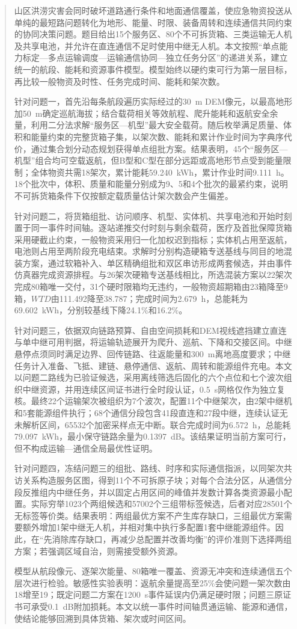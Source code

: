 \begin{abstract}
山区洪涝灾害会同时破坏道路通行条件和地面通信覆盖，使应急物资投送从单纯的最短路问题转化为地形、能量、时限、装备周转和连续通信共同约束的协同决策问题。题目给出15个服务区、80个不可拆货箱、三类运输无人机及共享电池，并允许在直连通信不足时使用中继无人机。本文按照“单点能力标定—多点运输调度—运输通信协同—独立任务分区”的递进关系，建立统一的航段、能耗和资源事件模型。模型始终以硬约束可行为第一层目标，再比较一般物资及时性、任务完成时间、能耗和架次数。

针对问题一，首先沿每条航段遍历实际经过的30~m DEM像元，以最高地形加50~m确定巡航海拔；结合载荷相关等效航程、爬升能耗和返航安全余量，利用二分法求解“服务区—机型”最大安全载荷。随后枚举满足质量、体积和能量约束的完整货箱子集，以架次数、能耗和累计作业时间为字典序代价，通过集合划分动态规划获得单点组批方案。结果表明，45个“服务区—机型”组合均可空载返航，但B型和C型在部分远距或高地形节点受到能量限制；全体物资共需18架次，累计能耗59.240~kWh，累计作业时间9.111~h。18个批次中，体积、质量和能量分别成为9、5和4个批次的最紧约束，说明不可拆货箱条件下仅按额定载质量估计架次数会产生偏差。

针对问题二，将货箱组批、访问顺序、机型、实体机、共享电池和开始时刻置于同一事件时间轴。逐站递推交付时刻与剩余载荷，医疗及首批保障货箱采用硬截止约束，一般物资采用归一化加权迟到指标；实体机占用至返航，电池则占用至两阶段充电结束。求解时分别构造硬箱专送基线与同目的地混装方案，通过软箱补入、单区精确组批和双区串访形成两套候选，并由事件仿真器完成资源排程。与26架次硬箱专送基线相比，所选混装方案以22架次完成80箱唯一交付，31个硬时限箱均无违约，一般物资超期箱由23箱降至9箱，$WTD$由111.492降至38.787；完成时间为2.679~h，总能耗为69.602~kWh，分别较基线下降24.1\%和16.2\%。

针对问题三，依据双向链路预算、自由空间损耗和DEM视线遮挡建立直连与单中继可用判据，将运输轨迹展开为爬升、巡航、下降和交接区间。中继悬停点须同时满足边界、回传链路、往返能量和300~m离地高度要求；中继任务计入准备、飞抵、建链、悬停通信、返航、周转和能源组件充电。本文以问题二路线为已验证候选，采用离线筛选后固化的六个点位和七个波次组织中继资源，并用连续区间证书进行全时段认证，0.5~s网格仅作为独立复核。最终22个运输架次被组织为7个波次，配置11个中继架次，由2架中继机和5套能源组件执行；68个通信分段包含41段直连和27段中继，连续认证无未解析区间，65532个加密采样点无中断。联合完成时间为6.572~h，总能耗79.097~kWh，最小保守链路余量为0.1397~dB。该结果证明当前方案可行，但不构成运输—通信全局最优性证明。

针对问题四，冻结问题三的组批、路线、时序和实际通信指派，以同架次共访关系构造服务区图，得到11个不可拆原子块；对每个合法分区，从通信分段反推组内中继任务，并以固定占用区间的峰值并发数计算各类资源最小配置。实际穷举1023个两组候选和57002个三组带标签候选，后者对应28501个无标签等价类。结果表明：两组最优方案不产生库存缺口，三组最优方案需要额外增加1架中继无人机，并相对集中执行多配置1套中继能源组件。因此，在“先消除库存缺口，再减少总配置并改善均衡”的评价准则下选择两组方案；若强调区域自治，则需接受额外资源。

模型从航段像元、逐架次能量、80箱唯一覆盖、资源无冲突和连续通信五个层次进行检验。敏感性实验表明：返航余量提高至25\%会使问题一架次数由18增至19；既定问题二方案在1200~s事件延误内仍满足硬时限；问题三原证书可承受0.1~dB附加损耗。本文以统一事件时间轴贯通运输、能源和通信，使结论能够回溯到具体货箱、架次或时间区间。

\end{abstract}
